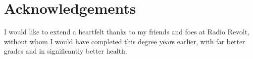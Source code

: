 \documentclass[b5paper]{report}
\begin{document}
\chapter*{Acknowledgements}
\thispagestyle{empty}
I would like to extend a heartfelt thanks to my friends and foes at Radio Revolt, without whom I would have completed this degree years earlier, with far better grades and in significantly better health.






\tableofcontents









\printskelnotes{}
\printbibliography

\begin{appendices}
  
\end{appendices}
\end{document}
